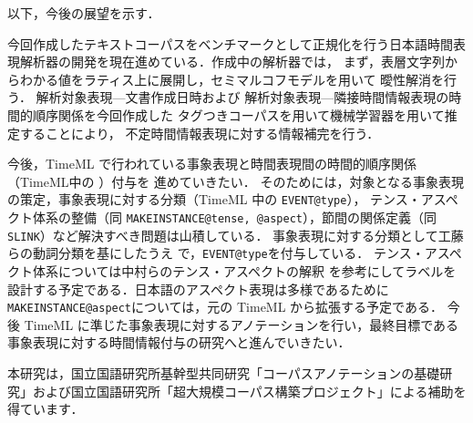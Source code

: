 \documentclass[japanese]{jnlp_1.4}
\def\tlink{}
\begin{document}
以下，今後の展望を示す．

今回作成したテキストコーパスをベンチマークとして正規化を行う日本語時間表現解析器の開発を現在進めている．作成中の解析器では，
まず，表層文字列からわかる値をラティス上に展開し，セミマルコフモデルを用いて
曖性解消を行う．
解析対象表現—文書作成日時および
解析対象表現—隣接時間情報表現の時間的順序関係を今回作成した
タグつきコーパスを用いて機械学習器を用いて推定することにより，
不定時間情報表現に対する情報補完を行う．

今後，TimeML で行われている事象表現と時間表現間の時間的順序関係（TimeML中の \tlink）付与を
進めていきたい．
そのためには，対象となる事象表現の策定，事象表現に対する分類（TimeML 中の {\tt EVENT@type}），
テンス・アスペクト体系の整備（同 {\tt MAKEINSTANCE@tense, @aspect}），節間の関係定義（同 {\tt SLINK}）など解決すべき問題は山積している．
事象表現に対する分類として工藤らの動詞分類\cite{工藤1995,工藤2004}を基にしたうえ
で，{\tt EVENT@type}を付与している．
テンス・アスペクト体系については中村らのテンス・アスペクトの解釈\cite{中村2001}
を参考にしてラベルを設計する予定である．日本語のアスペクト表現は多様であるために
{\tt MAKEINSTANCE@aspect}については，元の TimeML から拡張する予定である．
今後 TimeML に準じた事象表現に対するアノテーションを行い，最終目標である事象表現に対する時間情報付与の研究へと進んでいきたい．


\acknowledgment

本研究は，国立国語研究所基幹型共同研究「コーパスアノテーションの基礎研究」および国立国語研究所「超大規模コーパス構築プロジェクト」による補助を得ています．
\end{document}
